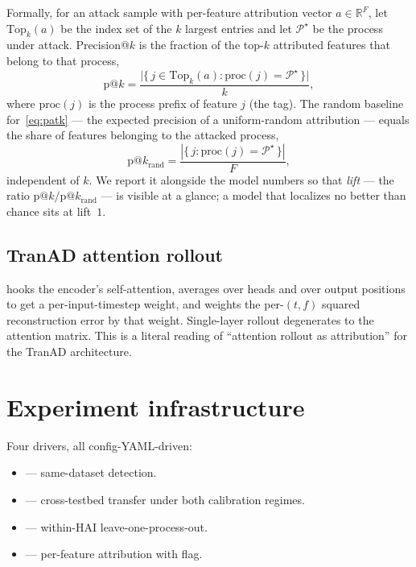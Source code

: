 Formally, for an attack sample with per-feature attribution vector $a \in \mathbb{R}^{F}$, let $\mathrm{Top}_k(a)$ be the index set of the $k$ largest entries and let $\mathcal{P}^\star$ be the process under attack.  Precision@$k$ is the fraction of the top-$k$ attributed features that belong to that process,
\begin{equation}
  \mathrm{p}@k = \frac{\bigl|\{\, j \in \mathrm{Top}_k(a) : \mathrm{proc}(j) = \mathcal{P}^\star \,\}\bigr|}{k},
  \label{eq:patk}
\end{equation}
where $\mathrm{proc}(j)$ is the process prefix of feature $j$ (the  tag).  The random baseline for~\eqref{eq:patk} --- the expected precision of a uniform-random attribution --- equals the share of features belonging to the attacked process,
\begin{equation}
  \mathrm{p}@k_{\mathrm{rand}} = \frac{|\{\, j : \mathrm{proc}(j) = \mathcal{P}^\star \,\}|}{F},
\end{equation}
independent of $k$.  We report it alongside the model numbers so that \emph{lift} --- the ratio $\mathrm{p}@k / \mathrm{p}@k_{\mathrm{rand}}$ --- is visible at a glance; a model that localizes no better than chance sits at lift~$1$.

\subsection{TranAD attention rollout}
\label{sec:tranad-attn}

 hooks the encoder's self-attention, averages over heads and over output positions to get a per-input-timestep weight, and weights the per-$(t,f)$ squared reconstruction error by that weight.  Single-layer rollout degenerates to the attention matrix.  This is a literal reading of ``attention rollout as attribution'' for the TranAD architecture.

\section{Experiment infrastructure}

Four drivers, all config-YAML-driven:
\begin{itemize}
  \item {} --- same-dataset detection.
  \item {} --- cross-testbed transfer under both calibration regimes.
  \item {} --- within-HAI leave-one-process-out.
  \item {} --- per-feature attribution with  flag.
\end{itemize}

